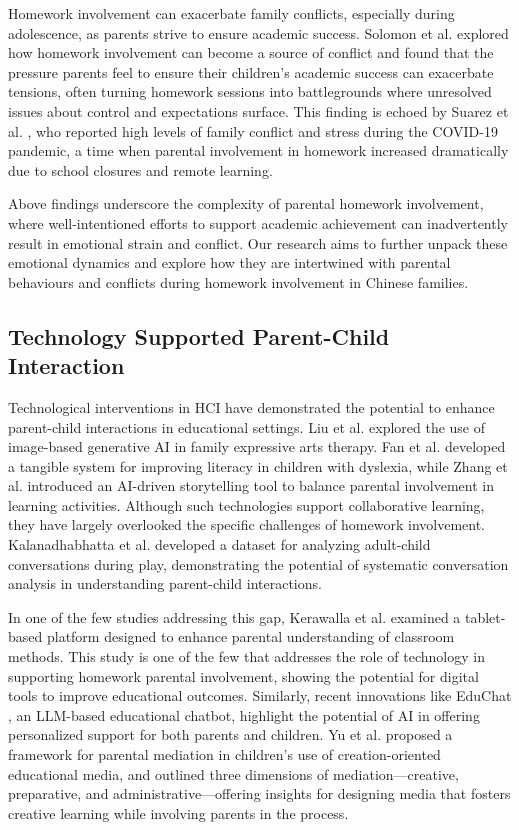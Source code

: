 Homework involvement can exacerbate family conflicts, especially during adolescence, as parents strive to ensure academic success. Solomon et al. \cite{solomon2002helping} explored how homework involvement can become a source of conflict and found that the pressure parents feel to ensure their children's academic success can exacerbate tensions, often turning homework sessions into battlegrounds where unresolved issues about control and expectations surface. This finding is echoed by Suarez et al. \cite{suarez2022parental}, who reported high levels of family conflict and stress during the COVID-19 pandemic, a time when parental involvement in homework increased dramatically due to school closures and remote learning. 

Above findings underscore the complexity of parental homework involvement, where well-intentioned efforts to support academic achievement can inadvertently result in emotional strain and conflict. Our research aims to further unpack these emotional dynamics and explore how they are intertwined with parental behaviours and conflicts during homework involvement in Chinese families.


\subsection{Technology Supported Parent-Child Interaction}

Technological interventions in HCI have demonstrated the potential to enhance parent-child interactions in educational settings. Liu et al. \cite{liu2024he} explored the use of image-based generative AI in family expressive arts therapy. Fan et al. \cite{fan2019character} developed a tangible system for improving literacy in children with dyslexia, while Zhang et al. \cite{zhang2022storybuddy} introduced an AI-driven storytelling tool to balance parental involvement in learning activities. Although such technologies support collaborative learning, they have largely overlooked the specific challenges of homework involvement. Kalanadhabhatta et al. \cite{kalanadhabhatta2024playlogue} developed a dataset for analyzing adult-child conversations during play, demonstrating the potential of systematic conversation analysis in understanding parent-child interactions. 


In one of the few studies addressing this gap, Kerawalla et al. \cite{kerawalla2007exploring} examined a tablet-based platform designed to enhance parental understanding of classroom methods. This study is one of the few that addresses the role of technology in supporting homework parental involvement, showing the potential for digital tools to improve educational outcomes. Similarly, recent innovations like EduChat \cite{dan2023educhat}, an LLM-based educational chatbot, highlight the potential of AI in offering personalized support for both parents and children. Yu et al. \cite{yu2021parental} proposed a framework for parental mediation in children's use of creation-oriented educational media, and outlined three dimensions of mediation—creative, preparative, and administrative—offering insights for designing media that fosters creative learning while involving parents in the process. 



